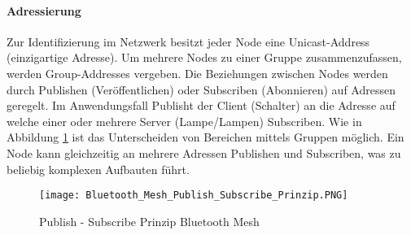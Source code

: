 \paragraph{Adressierung}

Zur Identifizierung im Netzwerk besitzt jeder Node eine Unicast-Address (einzigartige Adresse). Um mehrere Nodes zu einer Gruppe zusammenzufassen, werden Group-Addresses vergeben. Die Beziehungen zwischen Nodes werden durch Publishen (Veröffentlichen) oder Subscriben (Abonnieren) auf Adressen geregelt. Im Anwendungsfall Publisht der Client (Schalter) an die Adresse auf welche einer oder mehrere Server (Lampe/Lampen) Subscriben. Wie in Abbildung \ref{fig:BTMeshPublishSubscribePrinzip} ist das Unterscheiden von Bereichen mittels Gruppen möglich. Ein Node kann gleichzeitig an mehrere Adressen Publishen und Subscriben, was zu beliebig komplexen Aufbauten führt. 


\begin{figure} [H]
	\centering
	\texttt{[image: Bluetooth\_Mesh\_Publish\_Subscribe\_Prinzip.PNG]}
	\caption{Publish - Subscribe Prinzip Bluetooth Mesh \cite{bluetooth_sig_mesh-technology-overviewpdf_2020}} 
	\label{fig:BTMeshPublishSubscribePrinzip}
\end{figure}








